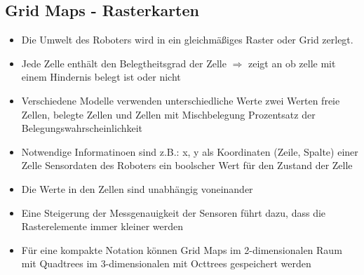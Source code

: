 \subsection{Grid Maps - Rasterkarten}
\begin{itemize}
	\item Die Umwelt des Roboters wird in ein gleichmäßiges Raster oder Grid zerlegt.
	\item Jede Zelle enthält den Belegtheitsgrad der Zelle $\Rightarrow$ zeigt an ob zelle mit einem Hindernis belegt ist oder nicht
	\item Verschiedene Modelle verwenden unterschiedliche Werte
	\subitem zwei Werten
	\subitem freie Zellen, belegte Zellen und Zellen mit Mischbelegung
	\subitem Prozentsatz der Belegungswahrscheinlichkeit
	\item Notwendige Informatinoen sind z.B.:
	\subitem x, y als Koordinaten (Zeile, Spalte) einer Zelle
	\subitem Sensordaten des Roboters
	\subitem ein boolscher Wert für den Zustand der Zelle
	\item Die Werte in den Zellen sind unabhängig voneinander
	\item Eine Steigerung der Messgenauigkeit der Sensoren führt dazu, dass die Rasterelemente immer kleiner werden
	\item Für eine kompakte Notation können Grid Maps im 2-dimensionalen Raum mit Quadtrees im 3-dimensionalen mit Octtrees gespeichert werden
\end{itemize}
